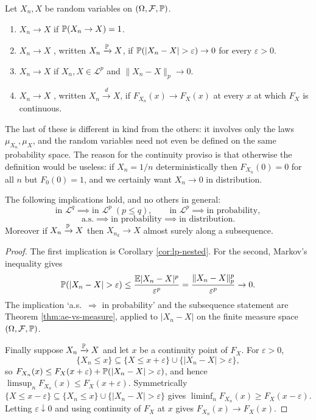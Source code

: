 \documentclass[a4paper]{scrartcl}
\newcommand{\cF}{\mathcal{F}}
\newcommand{\cL}{\mathcal{L}}
\begin{document}
\begin{definition}
	Let $X_n, X$ be random variables on $(\Omega,\cF,\PP)$.
	\begin{enumerate}[label=(\roman*)]
		\item $X_n \to X$  if $\mathbb{P}(X_n \to X) = 1$.
		\item $X_n \to X$ , written $X_n \xrightarrow{\mathbb{P}}X$, if $\PP(|X_n - X|>\varepsilon)\to 0$ for every $\varepsilon>0$.
		\item $X_n \to X$ \vocab{in $\cL^p$} if $X_n, X \in \cL^p$ and $\|X_n - X\|_p \to 0$.
		\item $X_n \to X$ , written $X_n \xrightarrow{d}X$, if $F_{X_n}(x)\to F_X(x)$ at every $x$ at which $F_X$ is continuous.
	\end{enumerate}
\end{definition}

The last of these is different in kind from the others: it involves only the laws $\mu_{X_n},\mu_X$, and the random variables need not even be defined on the same probability space. The reason for the continuity proviso is that otherwise the definition would be useless: if $X_n = 1/n$ deterministically then $F_{X_n}(0)=0$ for all $n$ but $F_0(0)=1$, and we certainly want $X_n \to 0$ in distribution.

\begin{theorem}\label{thm:modes}
	The following implications hold, and no others in general:
	$$
	\text{in }\cL^q \implies \text{in }\cL^p \; (p\leq q), \qquad \text{in }\cL^p \implies \text{in probability},
	$$
	$$
	\text{a.s.} \implies \text{in probability} \implies \text{in distribution}.
	$$
	Moreover if $X_n \xrightarrow{\mathbb{P}}X$ then $X_{n_k}\to X$ almost surely along a subsequence.
\end{theorem}
\begin{proof}
	The first implication is Corollary \ref{cor:lp-nested}. For the second, Markov's inequality gives
	$$
	\mathbb{P}(|X_n - X| > \varepsilon)\leq \frac{\mathbb{E}|X_n-X|^p}{\varepsilon^p} = \frac{\|X_n-X\|_p^p}{\varepsilon^p}\to 0.
	$$
	The implication `a.s.\ $\Rightarrow$ in probability' and the subsequence statement are Theorem \ref{thm:ae-vs-measure}, applied to $|X_n - X|$ on the finite measure space $(\Omega,\cF,\PP)$.

	Finally suppose $X_n\xrightarrow{\mathbb{P}}X$ and let $x$ be a continuity point of $F_X$. For $\varepsilon>0$,
	$$
	\{X_n \leq x\} \subseteq \{X \leq x+\varepsilon\}\cup\{|X_n - X|>\varepsilon\},
	$$
	so $F_{X_n}(x) \leq F_X(x+\varepsilon)+\PP(|X_n-X|>\varepsilon)$, and hence $\limsup_n F_{X_n}(x)\leq F_X(x+\varepsilon)$. Symmetrically $\{X\leq x - \varepsilon\}\subseteq\{X_n\leq x\}\cup\{|X_n-X|>\varepsilon\}$ gives $\liminf_n F_{X_n}(x)\geq F_X(x-\varepsilon)$. Letting $\varepsilon\downarrow 0$ and using continuity of $F_X$ at $x$ gives $F_{X_n}(x)\to F_X(x)$.
\end{proof}
\end{document}
